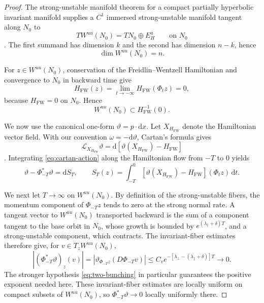 \documentclass[11pt]{article}
\theoremstyle{definition}
\theoremstyle{remark}
\newcommand{\Hs}{H_{\mathrm{FW}}}
\newcommand{\dd}{\mathrm{d}}
\begin{document}
\begin{proof}
The strong-unstable manifold theorem for a compact partially hyperbolic invariant manifold supplies a $C^1$ immersed strong-unstable manifold tangent along $N_0$ to
\begin{equation}
TW^{uu}(N_0)=TN_0\oplus E_H^u
\qquad\text{on }N_0
\label{eq:Wu-tangent}
\end{equation}
\cite{HirschPughShub1977,Fenichel1974}.  The first summand has dimension $k$ and the second has dimension $n-k$, hence
\[
\dim W^{uu}(N_0)=n.
\]

For $z\in W^{uu}(N_0)$, conservation of the Freidlin--Wentzell Hamiltonian and convergence to $N_0$ in backward time give
\[
\Hs(z)
=
\lim_{t\to-\infty}\Hs(\Phi_tz)
=0,
\]
because $\Hs=0$ on $N_0$.  Hence
\[
W^{uu}(N_0)\subset\Hs^{-1}(0).
\]

We now use the canonical one-form $\vartheta=p\cdot\dd x$.  Let $X_{\Hs}$ denote the Hamiltonian vector field.  With our convention $\omega=-\dd\vartheta$, Cartan's formula gives
\begin{equation}
\mathcal L_{X_{\Hs}}\vartheta
=
\dd\!\left[\vartheta(X_{\Hs})-\Hs\right]
\label{eq:cartan-action}
\end{equation}
\cite{MarsdenRatiu1999}.  Integrating \eqref{eq:cartan-action} along the Hamiltonian flow from $-T$ to $0$ yields
\begin{equation}
\vartheta-\Phi_{-T}^*\vartheta
=
\dd S_T,
\qquad
S_T(z)
=
\int_{-T}^{0}
\left[\vartheta(X_{\Hs})-\Hs\right](\Phi_tz)\,\dd t .
\label{eq:finite-action-primitive}
\end{equation}

We next let $T\to\infty$ on $W^{uu}(N_0)$.  By definition of the strong-unstable fibers, the momentum component of $\Phi_{-T}z$ tends to zero at the strong normal rate.  A tangent vector to $W^{uu}(N_0)$ transported backward is the sum of a component tangent to the base orbit in $N_0$, whose growth is bounded by $e^{(\lambda_\parallel+\delta)T}$, and a strong-unstable component, which contracts.  The invariant-fiber estimates therefore give, for $v\in T_zW^{uu}(N_0)$,
\[
\left|
(\Phi_{-T}^*\vartheta)_z(v)
\right|
=
\left|
\vartheta_{\Phi_{-T}z}(D\Phi_{-T}v)
\right|
\le
C_v e^{-[\lambda_\perp-(\lambda_\parallel+\delta)]T}
\longrightarrow0 .
\]
The stronger hypothesis \eqref{eq:two-bunching} in particular guarantees the positive exponent needed here.  These invariant-fiber estimates are locally uniform on compact subsets of $W^{uu}(N_0)$, so $\Phi_{-T}^*\vartheta\to0$ locally uniformly there.


\end{proof}
\end{document}
